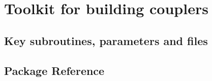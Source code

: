 \section{Toolkit for building couplers}
\label{sec:component_communications}
\subsection{Key subroutines, parameters and files}
\label{sec:pkg:component_communications:implementation_synopsis}
\subsection{Package Reference}

